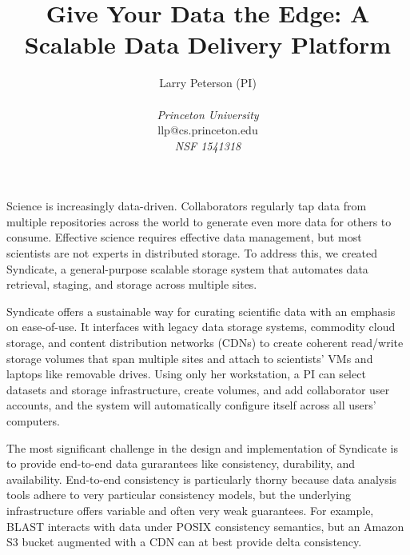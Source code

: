 \documentclass[letterpaper,twocolumn,10pt]{article}
\begin{document}
\date{}

\title{\Large \bf Give Your Data the Edge: A Scalable Data Delivery Platform}

\author{\rm Larry Peterson (PI)\\
\emph{}\\
\emph{Princeton University}\\
llp@cs.princeton.edu\\
\emph{NSF 1541318}
}

\maketitle

\thispagestyle{empty}

\setlength{\parskip}{0pt}
\setlength{\parsep}{0pt}
\setlength{\headsep}{0pt}
\setlength{\topskip}{0pt}
\setlength{\topmargin}{0pt}
\setlength{\topsep}{0pt}
\setlength{\partopsep}{0pt}

Science is increasingly data-driven.  Collaborators regularly tap data from
multiple repositories across the world to generate even more data for others to
consume.  Effective science requires effective data management, but most scientists are
not experts in distributed storage.  To address this, we created Syndicate, a
general-purpose scalable storage system that automates data retrieval, staging,
and storage across multiple sites.

Syndicate offers a sustainable way for curating scientific data with an emphasis
on ease-of-use.  It interfaces with legacy data storage systems,
commodity cloud storage, and content distribution networks (CDNs) to create coherent
read/write storage volumes that span multiple sites and attach to scientists' VMs and laptops like
removable drives.  Using only her workstation, a PI can select datasets and
storage infrastructure, create volumes, and add collaborator user accounts, and the system
will automatically configure itself across all users' computers.

The most significant challenge in the design and implementation of Syndicate
is to provide end-to-end data gurarantees like consistency, durability, and
availability.  End-to-end consistency is particularly
thorny because data analysis tools adhere to very particular consistency
models, but the underlying infrastructure offers variable and often very weak
guarantees.  For example, BLAST interacts with data under POSIX
consistency semantics, but an Amazon S3 bucket augmented with a CDN can at best
provide delta consistency.
\end{document}

